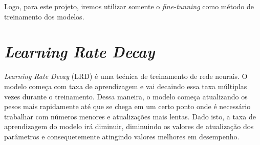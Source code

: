 \documentclass[ %
	msc, %
	portugues %
]{../ppgccufmg}
\begin{document}
    Logo, para este projeto, iremos utilizar somente o \textit{fine-tunning} como método de
    treinamento dos modelos.








    \section{\textit{Learning Rate Decay}}\label{sec:decay}

    \textit{Learning Rate Decay} (LRD) é uma tećnica de treinamento de rede neurais. O modelo começa com taxa
    de aprendizagem   e vai decaindo essa taxa múltiplas vezes durante o treinamento.
    Dessa maneira, o modelo começa atualizando os pesos mais rapidamente até que se chega em um
    certo ponto onde é necessário trabalhar com números menores e atualizações mais lentas. Dado isto, a taxa de
    aprendizagem do modelo irá diminuir, diminuindo os valores de atualização dos parâmetros e
    consequetemente atingindo valores melhores em desempenho.
\end{document}
